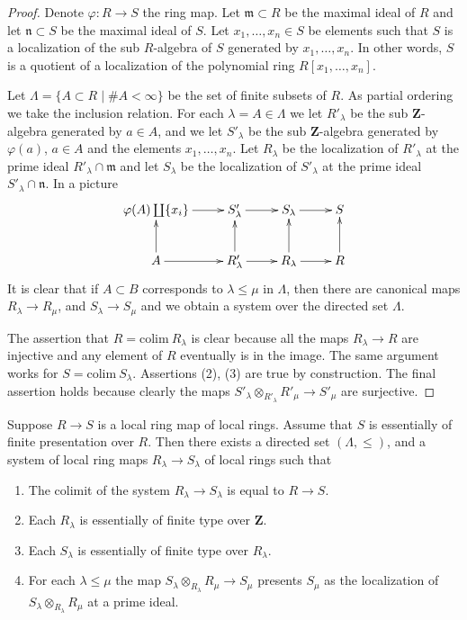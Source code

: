 \begin{proof}
Denote $\varphi : R  \to S$ the ring map.
Let $\mathfrak m \subset R$ be the maximal ideal
of $R$ and let $\mathfrak n \subset S$ be the maximal
ideal of $S$. Let $x_1, \ldots, x_n \in S$ be elements such that
$S$ is a localization of the sub $R$-algebra of $S$
generated by $x_1, \ldots, x_n$. In other words, $S$
is a quotient of a localization of the polynomial ring
$R[x_1, \ldots, x_n]$.

\medskip\noindent
Let $\Lambda = \{ A \subset R \mid \# A < \infty\}$
be the set of finite subsets of $R$. As partial
ordering we take the inclusion relation. For each
$\lambda = A \in \Lambda$ we let $R'_\lambda$ be
the sub $\mathbf{Z}$-algebra generated by
$a \in A$, and we let $S'_\lambda$ be the sub
$\mathbf{Z}$-algebra generated by $\varphi(a)$, $a \in A$
and the elements $x_1, \ldots, x_n$. Let $R_\lambda$ be
the localization of $R'_\lambda$ at the prime ideal
$R'_\lambda \cap \mathfrak m$ and let
$S_\lambda$ be the localization of $S'_\lambda$ at
the prime ideal $S'_\lambda \cap \mathfrak n$.
In a picture
$$
\xymatrix{
\varphi(A) \coprod \{x_i\} \ar[r] &
S'_\lambda \ar[r] &
S_\lambda \ar[r] &
S \\
A \ar[r] \ar[u] &
R'_\lambda \ar[r] \ar[u] &
R_\lambda \ar[r] \ar[u] &
R \ar[u]
}
$$
It is clear that if $A \subset B$ corresponds to
$\lambda \leq \mu$ in $\Lambda$, then there are
canonical maps $R_\lambda \to R_\mu$, and $S_\lambda \to S_\mu$
and we obtain a system over the directed set $\Lambda$.

\medskip\noindent
The assertion that $R = \text{colim}\ R_\lambda$ is clear
because all the maps $R_\lambda \to R$ are injective and
any element of $R$ eventually is in the image. The same
argument works for $S = \text{colim}\ S_\lambda$.
Assertions (2), (3) are true by construction.
The final assertion holds because clearly
the maps $S'_\lambda \otimes_{R'_\lambda} R'_\mu
\to S'_\mu$ are surjective.
\end{proof}

\begin{lemma}
\label{lemma-limit-essentially-finite-presentation}
Suppose $R \to S$ is a local ring map of local rings.
Assume that $S$ is essentially of finite presentation over $R$.
Then there exists a directed set $(\Lambda, \leq)$, and
a system of local ring maps $R_\lambda \to S_\lambda$
of local rings such that
\begin{enumerate}
\item The colimit of the system $R_\lambda \to S_\lambda$
is equal to $R \to S$.
\item Each $R_\lambda$ is essentially of finite type
over $\mathbf{Z}$.
\item Each $S_\lambda$ is essentially of finite type
over $R_\lambda$.
\item For each $\lambda \leq \mu$ the map
$S_\lambda \otimes_{R_\lambda} R_\mu \to S_\mu$
presents $S_\mu$ as the localization of
$S_\lambda \otimes_{R_\lambda} R_\mu$
at a prime ideal.
\end{enumerate}
\end{lemma}

